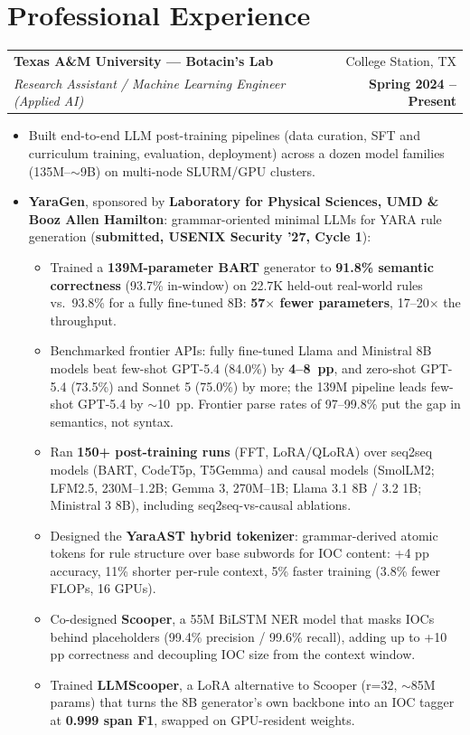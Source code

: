 \documentclass[letterpaper,11pt]{article}
\makeatletter
\newcommand{\entry}[4]{%
  \vspace{2pt}%
  \begin{tabular*}{\textwidth}{@{}l@{\extracolsep{\fill}}r@{}}
    \textbf{#1} & #2 \\
    \textit{\small #3} & \textbf{\small #4} \\
  \end{tabular*}\par\vspace{-1pt}%
}
\makeatother
\begin{document}
\section{Professional Experience}

\entry
  {Texas A\&M University --- Botacin's Lab}{College Station, TX}
  {Research Assistant / Machine Learning Engineer (Applied AI)}{Spring 2024 -- Present}
\begin{itemize}\small
  \item Built end-to-end LLM post-training pipelines (data curation, SFT and curriculum training, evaluation, deployment) across a dozen model families (135M--$\sim$9B) on multi-node SLURM/GPU clusters.
  \item \textbf{YaraGen}, sponsored by \textbf{Laboratory for Physical Sciences, UMD \& Booz Allen Hamilton}: grammar-oriented minimal LLMs for YARA rule generation (\textbf{submitted, USENIX Security '27, Cycle 1}):
  \begin{itemize}\small
    \item Trained a \textbf{139M-parameter BART} generator to \textbf{91.8\% semantic correctness} (93.7\% in-window) on 22.7K held-out real-world rules vs.\ 93.8\% for a fully fine-tuned 8B: \textbf{57$\times$ fewer parameters}, 17--20$\times$ the throughput.
    \item Benchmarked frontier APIs: fully fine-tuned Llama and Ministral 8B models beat few-shot GPT-5.4 (84.0\%) by \textbf{4--8~pp}, and zero-shot GPT-5.4 (73.5\%) and Sonnet 5 (75.0\%) by more; the 139M pipeline leads few-shot GPT-5.4 by $\sim$10~pp. Frontier parse rates of 97--99.8\% put the gap in semantics, not syntax.
    \item Ran \textbf{150+ post-training runs} (FFT, LoRA/QLoRA) over seq2seq models (BART, CodeT5p, T5Gemma) and causal models (SmolLM2; LFM2.5, 230M--1.2B; Gemma 3, 270M--1B; Llama 3.1 8B / 3.2 1B; Ministral 3 8B), including seq2seq-vs-causal ablations.
    \item Designed the \textbf{YaraAST hybrid tokenizer}: grammar-derived atomic tokens for rule structure over base subwords for IOC content: +4 pp accuracy, 11\% shorter per-rule context, 5\% faster training (3.8\% fewer FLOPs, 16 GPUs).
    \item Co-designed \textbf{Scooper}, a 55M BiLSTM NER model that masks IOCs behind placeholders (99.4\% precision / 99.6\% recall), adding up to +10 pp correctness and decoupling IOC size from the context window.
    \item Trained \textbf{LLMScooper}, a LoRA alternative to Scooper (r=32, $\sim$85M params) that turns the 8B generator's own backbone into an IOC tagger at \textbf{0.999 span F1}, swapped on GPU-resident weights.

\end{itemize}
\end{itemize}
\end{document}

